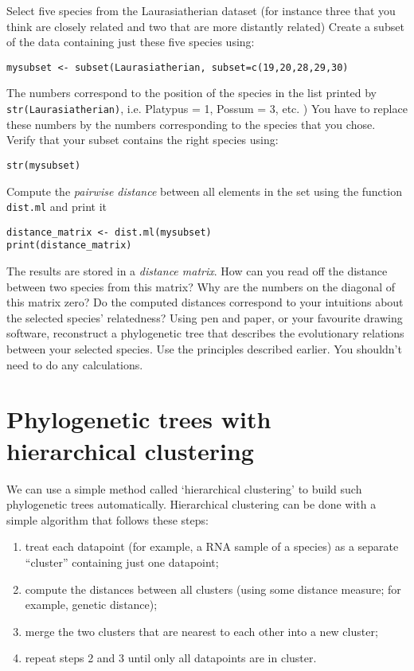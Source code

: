 \documentclass[a4paper, 9pt]{article}
\begin{document}
\begin{exercise}
    \action Select five species from the Laurasiatherian dataset (for instance three that you think are closely related and two that are more distantly related)
    \action Create a subset of the data containing just these five species using:\begin{lstlisting}
mysubset <- subset(Laurasiatherian, subset=c(19,20,28,29,30)
\end{lstlisting}
    The numbers correspond to the position of the species in the list printed by \texttt{str(Laurasiatherian)}, i.e. Platypus = 1, Possum = 3, etc. )
    You have to replace these numbers by the numbers corresponding to the species that you chose. 
    \action Verify that your subset contains the right species using:
\begin{lstlisting}
str(mysubset) 
\end{lstlisting}
    \action Compute the \textit{pairwise distance} between all elements in the set using the function \verb|dist.ml| and print it\begin{lstlisting}
distance_matrix <- dist.ml(mysubset)
print(distance_matrix)\end{lstlisting}
The results are stored in a \textit{distance matrix}. How can you read off the distance between two species from this matrix? Why are the numbers on the diagonal of this matrix zero?
    \action Do the computed distances correspond to your intuitions about the selected species' relatedness?
    \askstar Using pen and paper, or your favourite drawing software, reconstruct a phylogenetic tree that describes the evolutionary relations between your selected species. Use the principles described earlier. You shouldn't need to do any calculations. 
\end{exercise}


\section{Phylogenetic trees with hierarchical clustering}
We can use a simple method called `hierarchical clustering' to build
such phylogenetic trees automatically. Hierarchical clustering can be
done with a simple algorithm that follows these steps:

\begin{enumerate}
\item treat each datapoint (for example, a RNA sample of a species) as a separate ``cluster'' containing just one datapoint;
\item compute the distances between all clusters (using some distance measure; for example, genetic distance);
\item merge the two clusters that are nearest to each other into a new cluster;
\item repeat steps 2 and 3 until only all datapoints are in cluster. 
\end{enumerate}
\end{document}
